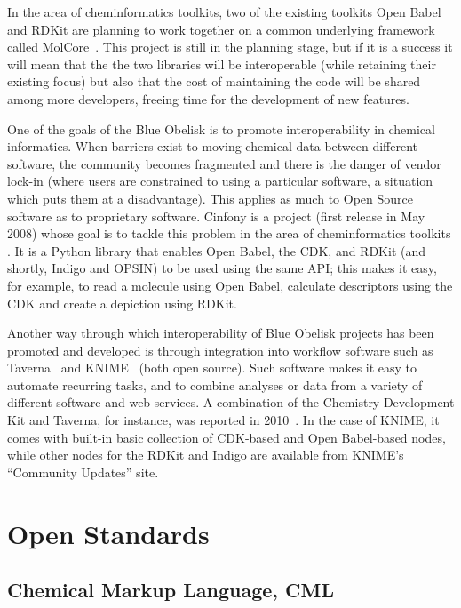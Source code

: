 \documentclass[10pt]{bmc_article}
\newenvironment{bmcformat}{\fussy\setboolean{publ}{true}}{\fussy}
\begin{document}
\begin{bmcformat}
In the area of cheminformatics toolkits, two of the existing toolkits
Open Babel and RDKit are planning to work together on a common
underlying framework called MolCore~\cite{WebMolCore}. This project is still in the
planning stage, but if it is a success it will mean that the the two
libraries will be interoperable (while retaining their existing focus)
but also that the cost of maintaining the code will be shared among
more developers, freeing time for the development of new features.

One of the goals of the Blue Obelisk is to promote interoperability in chemical
informatics. When barriers exist to moving chemical data between
different software, the community becomes fragmented and there is
the danger of vendor lock-in (where users are constrained to using
a particular software, a situation which puts them at a
disadvantage). This applies as much to Open Source software as to
proprietary software. Cinfony is a project (first release in May 2008)
whose goal is to tackle this problem in the area of cheminformatics
toolkits \cite{OBoyleCinfony2008}.
It is a Python library that enables Open Babel, the CDK, and RDKit
(and shortly, Indigo and OPSIN) to
be used using the same API; this makes it easy, for example, to read a
molecule using Open Babel, calculate descriptors using the CDK and
create a depiction using RDKit.

Another way through which interoperability of Blue Obelisk projects
has been promoted and developed is through integration into
workflow software such as Taverna~\cite{Hull:2006p60} and
KNIME~\cite{WebKNIME} (both open source).
Such software makes it easy to automate recurring
tasks, and to combine analyses or data from a variety of different software
and web services.
A combination of the Chemistry Development Kit and Taverna, for instance, was
reported in 2010~\cite{Kuhn:2010p4001}. 
In the case of KNIME, it comes with built-in basic collection of CDK-based and
Open Babel-based nodes, while other nodes for the RDKit and Indigo are
available from KNIME's ``Community Updates'' site.


\section*{Open Standards}

\subsection*{Chemical Markup Language, CML}


\end{bmcformat}
\end{document}
